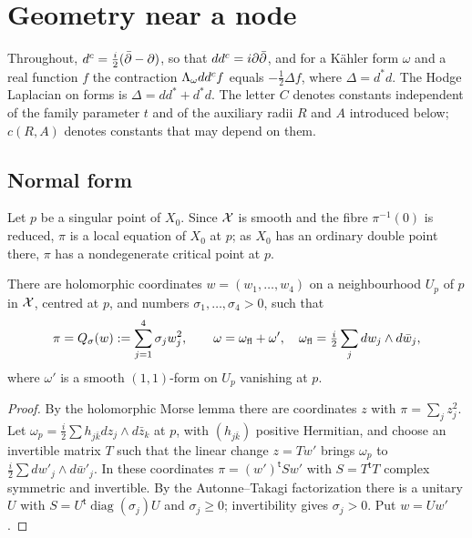 \section{Geometry near a node}\label{sec:node}

Throughout, $d^c=\tfrac i2(\bar\partial-\partial)$, so that
$dd^c=i\partial\bar\partial$, and for a K\"ahler form $\omega$ and a real
function $f$ the contraction $\Lambda_\omega dd^c f$ equals $-\tfrac12\Delta f$,
where $\Delta=d^*d$. The Hodge Laplacian on forms is $\Delta=dd^*+d^*d$.
The letter $C$ denotes constants independent of the family parameter $t$
and of the auxiliary radii $R$ and $A$ introduced below; $c(R,A)$ denotes
constants that may depend on them.

\subsection{Normal form}
Let $p$ be a singular point of $X_0$. Since $\mathcal X$ is smooth and the fibre $\pi^{-1}(0)$ is reduced, $\pi$ is
a local equation of $X_0$ at $p$; as $X_0$ has an ordinary double point
there, $\pi$ has a nondegenerate critical point at $p$.

\begin{lemma}\label{lem:normal-form}
There are holomorphic coordinates $w=(w_1,\ldots,w_4)$ on a neighbourhood
$U_p$ of $p$ in $\mathcal X$, centred at $p$, and numbers $\sigma_1,\ldots,\sigma_4>0$,
such that
\begin{equation}\label{eq:normal-form}
 \pi=Q_\sigma(w):=\sum_{j=1}^4\sigma_jw_j^2,\qquad
 \omega=\omega_{\rm fl}+\omega',\quad
 \omega_{\rm fl}=\tfrac i2\sum_jdw_j\wedge d\bar w_j,
\end{equation}
where $\omega'$ is a smooth $(1,1)$-form on $U_p$ vanishing at $p$.
\end{lemma}
\begin{proof}
By the holomorphic Morse lemma there are coordinates $z$ with
$\pi=\sum_jz_j^2$. Let $\omega_p=\tfrac i2\sum h_{j\bar k}dz_j\wedge d\bar z_k$
at $p$, with $(h_{j\bar k})$ positive Hermitian, and choose an invertible
matrix $T$ such that the linear change $z=Tw'$ brings $\omega_p$ to
$\tfrac i2\sum dw'_j\wedge d\bar w'_j$. In these coordinates
$\pi=(w')^{\mathsf t}Sw'$ with $S=T^{\mathsf t}T$ complex symmetric and invertible. By the
Autonne--Takagi factorization \cite[Section~4.4]{horn-johnson} there is
a unitary $U$ with $S=U^{\mathsf t}\operatorname{diag}(\sigma_j)U$ and
$\sigma_j\ge0$; invertibility gives $\sigma_j>0$. Put $w=Uw'$.
\end{proof}

